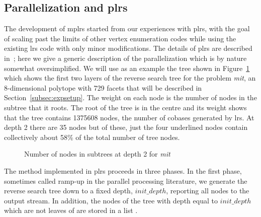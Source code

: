 \documentclass[a4paper,11pt]{article}   \usepackage{authblk} \usepackage[top=1.9cm,bottom=1.9cm,left=1.9cm,right=1.9cm]{geometry}
\newcommand{\progname}{\textsf}
\newcommand{\lrs}{\progname{lrs}\xspace}
\newcommand{\plrs}{\progname{plrs}\xspace}
\newcommand{\mplrs}{\progname{mplrs}\xspace}
\newcommand{\polytope}{\emph}
\newcommand{\mitine}{\polytope{mit}\xspace}
\newcommand{\initdepth}{\ensuremath{\mathit{init\_depth}}\xspace}
\begin{document}
\subsection{Parallelization and \plrs}
\label{sec:plrs}

The development of \mplrs started from our experiences with \plrs, with
the goal of scaling past the limits of other vertex enumeration codes
while using the existing \lrs code with only minor modifications.
The details of \plrs are described in~\cite{AR13};
here we give a generic description of the parallelization
which is by nature somewhat oversimplified. We will use as an example the tree shown
in Figure~\ref{fig:mitfig} which shows the first two layers of the
reverse search tree for the problem \mitine, an 8-dimensional polytope with
729 facets that will be described in Section~\ref{subsec:expsetup}. 
The weight on each node is
the number of nodes in the subtree 
that it roots. The root of the tree is in the centre and its weight
shows that the tree contains 1375608 nodes, the number of cobases generated
by \lrs. At depth 2 there are 35 nodes but of these, just the four 
underlined nodes
contain collectively about 58\% of the total number of tree nodes.


\begin{figure}[htbp]
\centering
{}
\caption{Number of nodes in subtrees at depth 2 for \mitine}
\label{fig:mitfig}
\end{figure}
The method implemented in \plrs proceeds in three phases. 
In the first phase, sometimes called ramp-up in the parallel processing literature,
we generate the reverse search tree  down to a fixed
depth, \initdepth, reporting all nodes to the output stream. In addition, the nodes of the tree 
with depth equal to  \initdepth which are not leaves of 
are stored in a list . 
\end{document}
